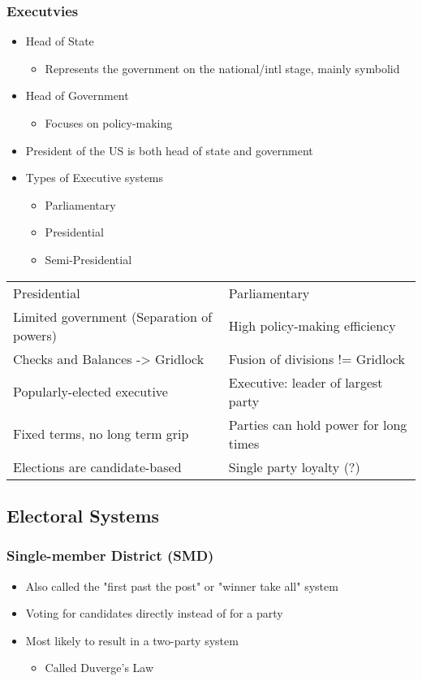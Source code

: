 \documentclass[11pt]{article}
\begin{document}
\subsubsection{Executvies}
\label{sec:org9a50996}
\begin{itemize}
\item Head of State
\begin{itemize}
\item Represents the government on the national/intl stage, mainly symbolid
\end{itemize}
\end{itemize}
\begin{itemize}
\item Head of Government
\begin{itemize}
\item Focuses on policy-making
\end{itemize}
\item President of the US is both head of state and government
\item Types of Executive systems
\begin{itemize}
\item Parliamentary
\item Presidential
\item Semi-Presidential
\end{itemize}
\end{itemize}
\begin{center}
\begin{tabular}{ll}
Presidential & Parliamentary\\
Limited government (Separation of powers) & High policy-making efficiency\\
Checks and Balances -> Gridlock & Fusion of divisions != Gridlock\\
Popularly-elected executive & Executive: leader of largest party\\
Fixed terms, no long term grip & Parties can hold power for long times\\
Elections are candidate-based & Single party loyalty (?)\\
\end{tabular}
\end{center}
\subsection{Electoral Systems}
\label{sec:org6d57082}
\subsubsection{Single-member District (SMD)}
\label{sec:org7540574}
\begin{itemize}
\item Also called the "first past the post" or "winner take all" system
\item Voting for candidates directly instead of for a party
\item Most likely to result in a two-party system
\begin{itemize}
\item Called Duverge's Law
\end{itemize}
\end{itemize}
\end{document}
